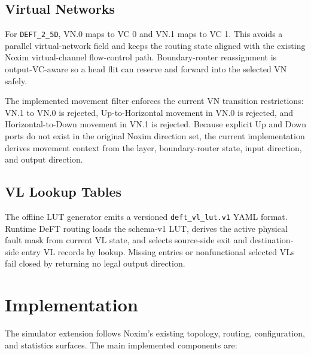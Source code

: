 \documentclass[conference]{IEEEtran}
\begin{document}
\subsection{Virtual Networks}

For \texttt{DEFT\_2\_5D}, VN.0 maps to VC 0 and VN.1 maps to VC 1. This avoids a parallel virtual-network field and keeps the routing state aligned with the existing Noxim virtual-channel flow-control path. Boundary-router reassignment is output-VC-aware so a head flit can reserve and forward into the selected VN safely.

The implemented movement filter enforces the current VN transition restrictions: VN.1 to VN.0 is rejected, Up-to-Horizontal movement in VN.0 is rejected, and Horizontal-to-Down movement in VN.1 is rejected. Because explicit Up and Down ports do not exist in the original Noxim direction set, the current implementation derives movement context from the layer, boundary-router state, input direction, and output direction.

\subsection{VL Lookup Tables}

The offline LUT generator emits a versioned \texttt{deft\_vl\_lut.v1} YAML format. Runtime DeFT routing loads the schema-v1 LUT, derives the active physical fault mask from current VL state, and selects source-side exit and destination-side entry VL records by lookup. Missing entries or nonfunctional selected VLs fail closed by returning no legal output direction.

\section{Implementation}

The simulator extension follows Noxim's existing topology, routing, configuration, and statistics surfaces. The main implemented components are:
\end{document}
